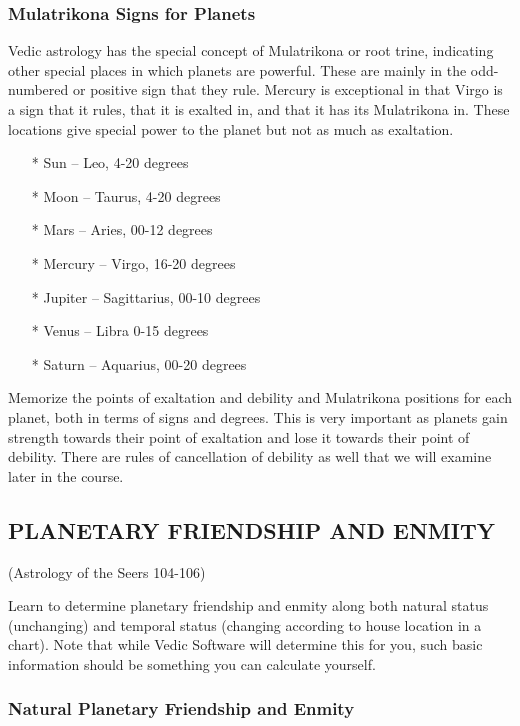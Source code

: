 \subsubsection{Mulatrikona Signs for Planets}

 

Vedic astrology has the special concept of Mulatrikona or root trine, indicating other special places in which planets are powerful. These are mainly in the odd-numbered or positive sign that they rule. Mercury is exceptional in that Virgo is a sign that it rules, that it is exalted in, and that it has its Mulatrikona in. These locations give special power to the planet but not as much as exaltation.

 

\begin{enumerate}
\item[*] Sun – Leo, 4-20 degrees
\item[*] Moon – Taurus, 4-20 degrees
\item[*] Mars – Aries, 00-12 degrees
\item[*] Mercury – Virgo, 16-20 degrees
\item[*] Jupiter – Sagittarius, 00-10 degrees
\item[*] Venus – Libra 0-15 degrees
\item[*] Saturn – Aquarius, 00-20 degrees
  \end{enumerate}

Memorize the points of exaltation and debility and Mulatrikona positions for each planet, both in terms of signs and degrees. This is very important as planets gain strength towards their point of exaltation and lose it towards their point of debility. There are rules of cancellation of debility as well that we will examine later in the course.

 

\subsection{PLANETARY FRIENDSHIP AND ENMITY }(Astrology of the Seers 104-106)
 

Learn to determine planetary friendship and enmity along both natural status (unchanging) and temporal status (changing according to house location in a chart). Note that while Vedic Software will determine this for you, such basic information should be something you can calculate yourself.

 

\subsubsection{Natural Planetary Friendship and Enmity}

